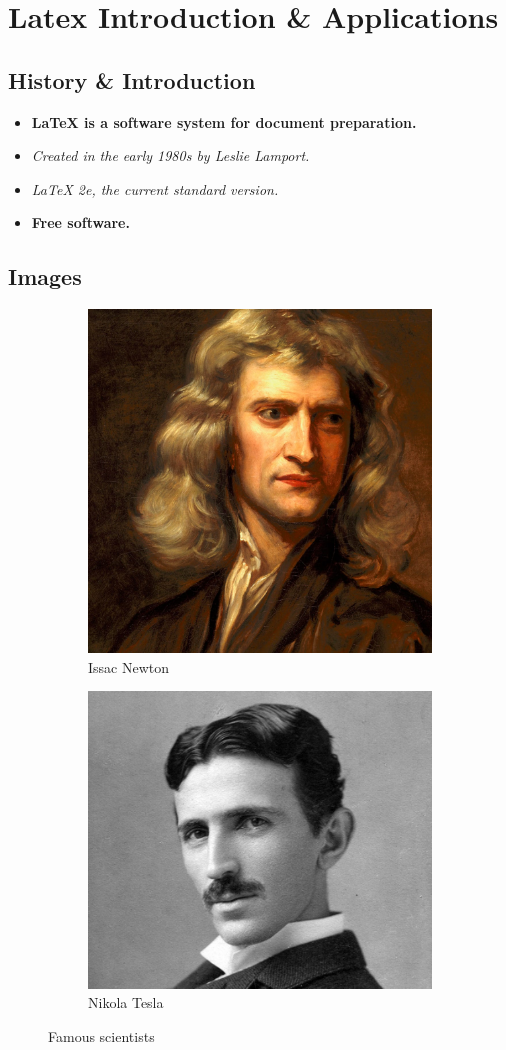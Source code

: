 \documentclass{memoir}
\begin{document}
\chapter{Latex Introduction \& Applications}

\section{History \& Introduction}
\begin{itemize}
	\item \textbf{LaTeX is a software system for document preparation.}
	\item \textit{Created in the early 1980s by Leslie Lamport.}
	\item \textit{LaTeX 2e, the current standard version.}
	\item \textbf{Free software.} 
\end{itemize}

\section{Images}

\begin{figure}[H]
	\centering
	\begin{subfigure}{0.5\linewidth}
		\centering
		\includegraphics[width=0.5\linewidth]{"newton"}
		\caption{Issac Newton}
		\label{fig:mg995_1}
	\end{subfigure}%
	\begin{subfigure}{0.5\linewidth}
		\centering
		\includegraphics[width=0.5\linewidth]{"tesla"}
		\caption{Nikola Tesla}
		\label{fig:mg995-schematic}
	\end{subfigure}
	\caption{Famous scientists}
	\label{fig:mg995_schema}
\end{figure}
\end{document}
